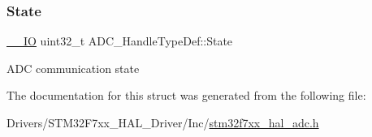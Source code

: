 \subsubsection{\texorpdfstring{State}{State}}
{\footnotesize\ttfamily \mbox{\hyperlink{core__sc300_8h_aec43007d9998a0a0e01faede4133d6be}{\+\_\+\+\_\+\+IO}} uint32\+\_\+t A\+D\+C\+\_\+\+Handle\+Type\+Def\+::\+State}

A\+DC communication state 

The documentation for this struct was generated from the following file\+:\begin{DoxyCompactItemize}
\item 
Drivers/\+S\+T\+M32\+F7xx\+\_\+\+H\+A\+L\+\_\+\+Driver/\+Inc/\mbox{\hyperlink{stm32f7xx__hal__adc_8h}{stm32f7xx\+\_\+hal\+\_\+adc.\+h}}\end{DoxyCompactItemize}
